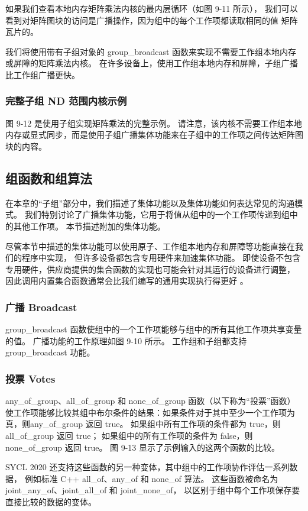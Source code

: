 如果我们查看本地内存矩阵乘法内核的最内层循环（如图 9-11 所示），
我们可以看到对矩阵图块的访问是广播操作，因为组中的每个工作项都读取相同的值 矩阵瓦片的。

我们将使用带有子组对象的 group\_broadcast 函数来实现不需要工作组本地内存或屏障的矩阵乘法内核。 
在许多设备上，使用工作组本地内存和屏障，子组广播比工作组广播更快。

\subsubsection{完整子组 ND 范围内核示例}
图 9-12 是使用子组实现矩阵乘法的完整示例。 
请注意，该内核不需要工作组本地内存或显式同步，而是使用子组广播集体功能来在子组中的工作项之间传达矩阵图块的内容。

\subsection{组函数和组算法}
在本章的“子组”部分中，我们描述了集体功能以及集体功能如何表达常见的沟通模式。 
我们特别讨论了广播集体功能，它用于将值从组中的一个工作项传递到组中的其他工作项。 本节描述附加的集体功能。

尽管本节中描述的集体功能可以使用原子、工作组本地内存和屏障等功能直接在我们的程序中实现，
但许多设备都包含专用硬件来加速集体功能。 
即使设备不包含专用硬件，供应商提供的集合函数的实现也可能会针对其运行的设备进行调整，
因此调用内置集合函数通常会比我们编写的通用实现执行得更好 。

\subsubsection{广播 Broadcast}
group\_broadcast 函数使组中的一个工作项能够与组中的所有其他工作项共享变量的值。 
广播功能的工作原理如图 9-10 所示。 工作组和子组都支持 group\_broadcast 功能。

\subsubsection{投票 Votes}
any\_of\_group、all\_of\_group 和 none\_of\_group 函数（以下称为“投票”函数）
使工作项能够比较其组中布尔条件的结果：如果条件对于其中至少一个工作项为真，则any\_of\_group 返回 true。 
如果组中所有工作项的条件都为 true，则 all\_of\_group 返回 true；
如果组中的所有工作项的条件为 false，则 none\_of\_group 返回 true。 
图 9-13 显示了示例输入的这两个函数的比较。

SYCL 2020 还支持这些函数的另一种变体，其中组中的工作项协作评估一系列数据，
例如标准 C++ all\_of、any\_of 和 none\_of 算法。 
这些函数被命名为 joint\_any\_of、joint\_all\_of 和 joint\_none\_of，
以区别于组中每个工作项保存要直接比较的数据的变体。

